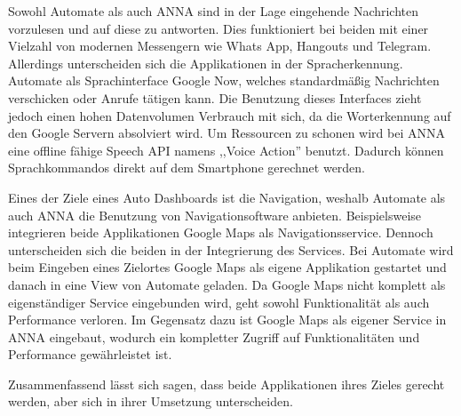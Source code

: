 Sowohl Automate als auch \ac{ANNA} sind in der Lage eingehende Nachrichten vorzulesen und auf diese zu antworten. Dies funktioniert bei beiden mit einer Vielzahl von modernen Messengern wie Whats App, Hangouts und Telegram. Allerdings unterscheiden sich die Applikationen in der Spracherkennung. Automate als Sprachinterface Google Now, welches standardmäßig Nachrichten verschicken oder Anrufe tätigen kann. Die Benutzung dieses Interfaces zieht jedoch einen hohen Datenvolumen Verbrauch mit sich, da die Worterkennung auf den Google Servern absolviert wird. Um Ressourcen zu schonen wird bei \ac{ANNA} eine offline fähige Speech \ac{API} namens ,,Voice Action'' benutzt. Dadurch können Sprachkommandos direkt auf dem Smartphone gerechnet werden. 

Eines der Ziele eines Auto Dashboards ist die Navigation, weshalb Automate als auch \ac{ANNA} die Benutzung von Navigationsoftware anbieten. Beispielsweise integrieren beide Applikationen Google Maps als Navigationsservice. Dennoch unterscheiden sich die beiden in der Integrierung des Services. Bei Automate wird beim Eingeben eines Zielortes Google Maps als eigene Applikation gestartet und danach in eine View von Automate geladen. Da Google Maps nicht komplett als eigenständiger Service eingebunden wird, geht sowohl Funktionalität als auch Performance verloren. Im Gegensatz dazu ist Google Maps als eigener Service in \ac{ANNA} eingebaut, wodurch ein kompletter Zugriff auf Funktionalitäten und Performance gewährleistet ist.

Zusammenfassend lässt sich sagen, dass beide Applikationen ihres Zieles gerecht werden, aber sich in ihrer Umsetzung unterscheiden.

